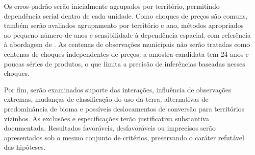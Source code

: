 Os erros-padrão serão inicialmente agrupados por território, permitindo dependência serial dentro de cada unidade. Como choques de preços são comuns, também serão avaliados agrupamento por território e ano, métodos apropriados ao pequeno número de anos e sensibilidade à dependência espacial, com referência à abordagem de . As centenas de observações municipais não serão tratadas como centenas de choques independentes de preços: a amostra candidata tem 24 anos e poucas séries de produtos, o que limita a precisão de inferências baseadas nesses choques.

Por fim, serão examinados suporte das interações, influência de observações extremas, mudanças de classificação do uso da terra, alternativas de predominância de bioma e possíveis deslocamentos de conversão para territórios vizinhos. As exclusões e especificações terão justificativa substantiva documentada. Resultados favoráveis, desfavoráveis ou imprecisos serão apresentados sob o mesmo conjunto de critérios, preservando o caráter refutável das hipóteses.

